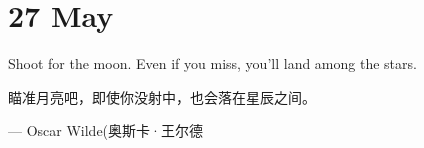 \section{27 May}
Shoot for the moon. Even if you miss, you'll land among the stars.

瞄准月亮吧，即使你没射中，也会落在星辰之间。\par
\hfill --- Oscar Wilde(奥斯卡·王尔德\par
